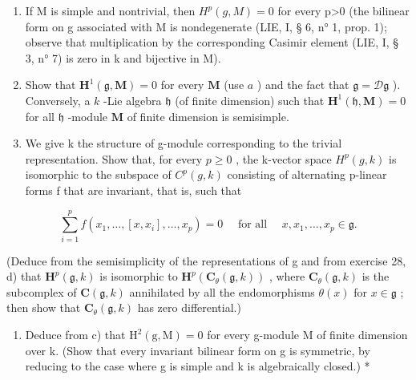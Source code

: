 \begin{enumerate}
\def\labelenumi{\alph{enumi})}
\item
  If M is simple and nontrivial, then \(H^{p}(g, M)=0\) for every p\textgreater0 (the bilinear form on g associated with M is nondegenerate (LIE, I, § 6, n° 1, prop. 1); observe that multiplication by the corresponding Casimir element (LIE, I, § 3, n° 7) is zero in k and bijective in M).
\item
  Show that \(\mathbf{H}^{1}(\mathfrak{g},\mathbf{M}) = 0\) for every \(\mathbf{M}\) (use \(a\) ) and the fact that \(\mathfrak{g} = \mathcal{D}\mathfrak{g}\) ). Conversely, a \(k\) -Lie algebra \(\mathfrak{h}\) (of finite dimension) such that \(\mathbf{H}^{1}(\mathfrak{h},\mathbf{M}) = 0\) for all \(\mathfrak{h}\) -module \(\mathbf{M}\) of finite dimension is semisimple.
\item
  We give k the structure of g-module corresponding to the trivial representation. Show that, for every \(p \geqslant 0\) , the k-vector space \(H^{p}(g, k)\) is isomorphic to the subspace of \(C^{p}(g, k)\) consisting of alternating p-linear forms f that are invariant, that is, such that
\end{enumerate}

\[
\sum_ {i = 1} ^ {p} f (x _ {1}, \dots , [ x, x _ {i} ], \dots , x _ {p}) = 0 \quad \text { for   all } \quad x, x _ {1}, \dots , x _ {p} \in \mathfrak {g}.
\]

(Deduce from the semisimplicity of the representations of g and from exercise 28, d) that \(\mathbf{H}^p(\mathfrak{g}, k)\) is isomorphic to \(\mathbf{H}^p(\mathbf{C}_{\theta}(\mathfrak{g}, k))\) , where \(\mathbf{C}_{\theta}(\mathfrak{g}, k)\) is the subcomplex of \(\mathbf{C}(\mathfrak{g}, k)\) annihilated by all the endomorphisms \(\theta(x)\) for \(x \in \mathfrak{g}\) ; then show that \(\mathbf{C}_{\theta}(\mathfrak{g}, k)\) has zero differential.)

\begin{enumerate}
\def\labelenumi{\alph{enumi})}
\setcounter{enumi}{3}
\tightlist
\item
  Deduce from c) that \(\mathrm{H}^{2}(\mathrm{g},\mathrm{M})=0\) for every g-module M of finite dimension over k. (Show that every invariant bilinear form on g is symmetric, by reducing to the case where g is simple and k is algebraically closed.) *
\end{enumerate}
\relax{}
